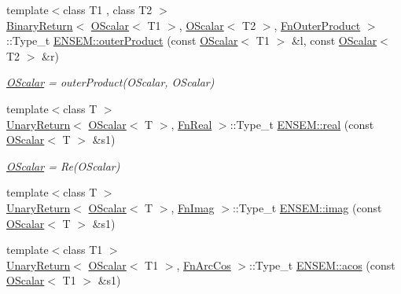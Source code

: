\begin{DoxyCompactItemize}
{\footnotesize template$<$class T1 , class T2 $>$ }\\\mbox{\hyperlink{structENSEM_1_1BinaryReturn}{Binary\+Return}}$<$ \mbox{\hyperlink{classENSEM_1_1OScalar}{O\+Scalar}}$<$ T1 $>$, \mbox{\hyperlink{classENSEM_1_1OScalar}{O\+Scalar}}$<$ T2 $>$, \mbox{\hyperlink{structENSEM_1_1FnOuterProduct}{Fn\+Outer\+Product}} $>$\+::Type\+\_\+t \mbox{\hyperlink{group__obsscalar_ga913f8b40c0c15203e199d1bafc122eea}{E\+N\+S\+E\+M\+::outer\+Product}} (const \mbox{\hyperlink{classENSEM_1_1OScalar}{O\+Scalar}}$<$ T1 $>$ \&l, const \mbox{\hyperlink{classENSEM_1_1OScalar}{O\+Scalar}}$<$ T2 $>$ \&r)
\begin{DoxyCompactList}\small\item\em \mbox{\hyperlink{classENSEM_1_1OScalar}{O\+Scalar}} = outer\+Product(\+O\+Scalar, O\+Scalar) \end{DoxyCompactList}\item 
{\footnotesize template$<$class T $>$ }\\\mbox{\hyperlink{structENSEM_1_1UnaryReturn}{Unary\+Return}}$<$ \mbox{\hyperlink{classENSEM_1_1OScalar}{O\+Scalar}}$<$ T $>$, \mbox{\hyperlink{structENSEM_1_1FnReal}{Fn\+Real}} $>$\+::Type\+\_\+t \mbox{\hyperlink{group__obsscalar_gaad780424129e881b69f2435599861fb2}{E\+N\+S\+E\+M\+::real}} (const \mbox{\hyperlink{classENSEM_1_1OScalar}{O\+Scalar}}$<$ T $>$ \&s1)
\begin{DoxyCompactList}\small\item\em \mbox{\hyperlink{classENSEM_1_1OScalar}{O\+Scalar}} = Re(\+O\+Scalar) \end{DoxyCompactList}\item 
{\footnotesize template$<$class T $>$ }\\\mbox{\hyperlink{structENSEM_1_1UnaryReturn}{Unary\+Return}}$<$ \mbox{\hyperlink{classENSEM_1_1OScalar}{O\+Scalar}}$<$ T $>$, \mbox{\hyperlink{structENSEM_1_1FnImag}{Fn\+Imag}} $>$\+::Type\+\_\+t \mbox{\hyperlink{group__obsscalar_ga5c386e541e4c92b380ed34d5a27a6b13}{E\+N\+S\+E\+M\+::imag}} (const \mbox{\hyperlink{classENSEM_1_1OScalar}{O\+Scalar}}$<$ T $>$ \&s1)
\item 
{\footnotesize template$<$class T1 $>$ }\\\mbox{\hyperlink{structENSEM_1_1UnaryReturn}{Unary\+Return}}$<$ \mbox{\hyperlink{classENSEM_1_1OScalar}{O\+Scalar}}$<$ T1 $>$, \mbox{\hyperlink{structENSEM_1_1FnArcCos}{Fn\+Arc\+Cos}} $>$\+::Type\+\_\+t \mbox{\hyperlink{group__obsscalar_ga734866f3eb39843cc901768dff4f6283}{E\+N\+S\+E\+M\+::acos}} (const \mbox{\hyperlink{classENSEM_1_1OScalar}{O\+Scalar}}$<$ T1 $>$ \&s1)

\end{DoxyCompactItemize}
